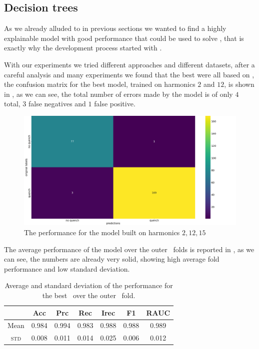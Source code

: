 \subsection{Decision trees}
\label{sec:qrp-dt}
As we already alluded to in previous sections we wanted to find a highly explainable model with good
performance that could be used to solve \qrp, that is exactly why the development process started
with \dts.

With our experiments we tried different approaches and different datasets, after a careful analysis
and many experiments we found that the best \dts were all based on \an, the confusion matrix for
the best model, trained on harmonics $2$ and $12$, is shown in , as we can
see, the total number of errors made by the model is of only $4$ total, $3$ false negatives and $1$
false positive.
\begin{figure}[h!]
	\centering
	\includegraphics[width=\linewidth]{img/An_2_12_cm_dt.png}
	\caption{The performance for the \an model built on harmonics $2, 12, 15$}
	\label{fig:dt-an-2-12-cm}
\end{figure}
The average performance of the model over the outer \cv\ folds is reported in ,
as we can see, the numbers are already very solid, showing high average fold performance and low
standard deviation.
\begin{table}[t]
	\caption{Average and standard deviation of the performance for the best \dt\ over the outer \cv\
		fold.}\label{tbl:an-2-12-perf}

	\bigskip
	\setlength{\tabcolsep}{6pt}
	\centering
	\begin{tabular}{ccccccc}
		\toprule
		\textbf{}    & \textbf{Acc} & \textbf{Prc} & \textbf{Rec} & \textbf{Irec} & \textbf{F1} & \textbf{RAUC} \\
		\midrule
		Mean         & 0.984        & 0.994        & 0.983        & 0.988         & 0.988
		             & 0.989                                                                                    \\
		\textsc{std} & 0.008        & 0.011        & 0.014        & 0.025         & 0.006
		             & 0.012                                                                                    \\
		\bottomrule
	\end{tabular}
\end{table}
